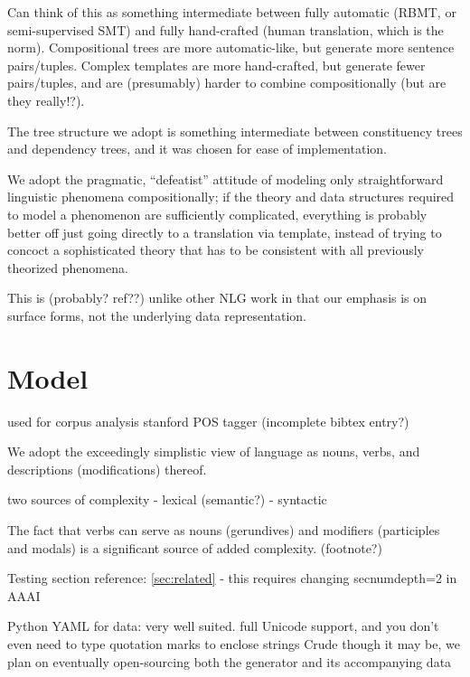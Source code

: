 Can think of this as something intermediate between fully automatic (RBMT, or semi-supervised SMT) and fully hand-crafted (human translation, which is the norm).
Compositional trees are more automatic-like, but generate more sentence pairs/tuples.
Complex templates are more hand-crafted, but generate fewer pairs/tuples, and are (presumably) harder to combine compositionally (but are they really!?).

The tree structure we adopt is something intermediate between constituency trees and dependency trees, and it was chosen for ease of implementation.

We adopt the pragmatic, ``defeatist'' attitude of modeling only straightforward linguistic phenomena compositionally; if the theory and data structures required to model a phenomenon are sufficiently complicated, everything is probably better off just going directly to a translation via template, instead of trying to concoct a sophisticated theory that has to be consistent with all previously theorized phenomena.

This is (probably? ref??) unlike other NLG work in that our emphasis is on surface forms, not the underlying data representation.


\section{Model}

used for corpus analysis stanford POS tagger (incomplete bibtex entry?) 

We adopt the exceedingly simplistic view of language as nouns, verbs, and descriptions (modifications) thereof.

two sources of complexity
- lexical (semantic?)
- syntactic 

The fact that verbs can serve as nouns (gerundives) and modifiers (participles and modals) is a significant source of added complexity. (footnote?)

Testing section reference: \ref{sec:related} - this requires changing secnumdepth=2 in AAAI

Python
YAML for data: very well suited. full Unicode support, and you don't even need to type quotation marks to enclose strings
Crude though it may be, we plan on eventually open-sourcing both the generator and its accompanying data





